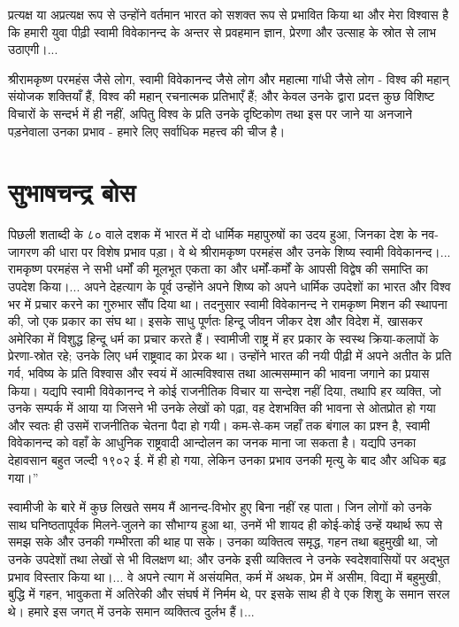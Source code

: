 प्रत्यक्ष या अप्रत्यक्ष रूप से उन्होंने वर्तमान भारत को सशक्त रूप से प्रभावित किया था और मेरा विश्वास है कि हमारी युवा पीढ़ी स्वामी विवेकानन्द के अन्तर से प्रवहमान ज्ञान, प्रेरणा और उत्साह के स्रोत से लाभ उठाएगी।... 

श्रीरामकृष्ण परमहंस जैसे लोग, स्वामी विवेकानन्द जैसे लोग और महात्मा गांधी जैसे लोग - विश्व की महान् संयोजक शक्तियाँ हैं, विश्व की महान् रचनात्मक प्रतिभाएँ हैं; और केवल उनके द्वारा प्रदत्त कुछ विशिष्ट विचारों के सन्दर्भ में ही नहीं, अपितु विश्व के प्रति उनके दृष्टिकोण तथा इस पर जाने या अनजाने पड़नेवाला उनका प्रभाव - हमारे लिए सर्वाधिक महत्त्व की चीज है।


\section*{सुभाषचन्द्र बोस}


पिछली शताब्दी के ८० वाले दशक में भारत में दो धार्मिक महापुरुषों का उदय हुआ, जिनका देश के नव-जागरण की धारा पर विशेष प्रभाव पड़ा। वे थे श्रीरामकृष्ण परमहंस और उनके शिष्य स्वामी विवेकानन्द।... रामकृष्ण परमहंस ने सभी धर्मों की मूलभूत एकता का और धर्मों-कर्मों के आपसी विद्वेष की समाप्ति का उपदेश किया।... अपने देहत्याग के पूर्व उन्होंने अपने शिष्य को अपने धार्मिक उपदेशों का भारत और विश्व भर में प्रचार करने का गुरुभार सौंप दिया था। तदनुसार स्वामी विवेकानन्द ने रामकृष्ण मिशन की स्थापना की, जो एक प्रकार का संघ था। इसके साधु पूर्णतः हिन्दू जीवन जीकर देश और विदेश में, खासकर अमेरिका में विशुद्ध हिन्दू धर्म का प्रचार करते हैं। स्वामीजी राष्ट्र में हर प्रकार के स्वस्थ क्रिया-कलापों के प्रेरणा-स्रोत रहे; उनके लिए धर्म राष्ट्रवाद का प्रेरक था। उन्होंने भारत की नयी पीढ़ी में अपने अतीत के प्रति गर्व, भविष्य के प्रति विश्वास और स्वयं में आत्मविश्वास तथा आत्मसम्मान की भावना जगाने का प्रयास किया। यद्यपि स्वामी विवेकानन्द ने कोई राजनीतिक विचार या सन्देश नहीं दिया, तथापि हर व्यक्ति, जो उनके सम्पर्क में आया या जिसने भी उनके लेखों को पढ़ा, वह देशभक्ति की भावना से ओतप्रोत हो गया और स्वतः ही उसमें राजनीतिक चेतना पैदा हो गयी। कम-से-कम जहाँ तक बंगाल का प्रश्न है, स्वामी विवेकानन्द को वहाँ के आधुनिक राष्ट्रवादी आन्दोलन का जनक माना जा सकता है। यद्यपि उनका देहावसान बहुत जल्दी १९०२ ई. में ही हो गया, लेकिन उनका प्रभाव उनकी मृत्यु के बाद और अधिक बढ़ गया।” 

स्वामीजी के बारे में कुछ लिखते समय मैं आनन्द-विभोर हुए बिना नहीं रह पाता। जिन लोगों को उनके साथ घनिष्ठतापूर्वक मिलने-जुलने का सौभाग्य हुआ था, उनमें भी शायद ही कोई-कोई उन्हें यथार्थ रूप से समझ सके और उनकी गम्भीरता की थाह पा सके। उनका व्यक्तित्व समृद्ध, गहन तथा बहुमुखी था, जो उनके उपदेशों तथा लेखों से भी विलक्षण था; और उनके इसी व्यक्तित्व ने उनके स्वदेशवासियों पर अद्भुत प्रभाव विस्तार किया था।... वे अपने त्याग में असंयमित, कर्म में अथक, प्रेम में असीम, विद्या में बहुमुखी, बुद्धि में गहन, भावुकता में अतिरेकी और संघर्ष में निर्मम थे, पर इसके साथ ही वे एक शिशु के समान सरल थे। हमारे इस जगत् में उनके समान व्यक्तित्व दुर्लभ हैं।... 

